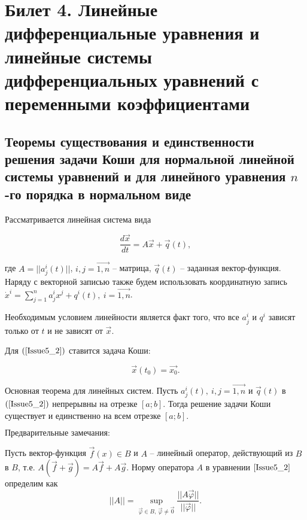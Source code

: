 \section{Билет 4. Линейные дифференциальные уравнения и линейные системы дифференциальных уравнений с переменными коэффициентами}

\subsection{Теоремы существования и единственности решения задачи Коши для нормальной линейной системы уравнений и
для линейного уравнения $n$-го порядка в нормальном виде}

Рассматривается линейная система вида

\begin{equation}
	\frac{d\overrightarrow{x}}{dt} = A\overrightarrow{x} + \overrightarrow{q}(t),
	\label{Issue5_2}
\end{equation}

где $A = ||a_j^i(t)||$, $i, j = \overrightarrow{1, n}$ -- матрица, $\overrightarrow{q}(t)$ -- заданная вектор-функция. Наряду с векторной записью также будем использовать координатную запись $\dot{x}^i = \sum\limits_{j = 1}^{n} a_j^i x^j + q^i(t),\ i = \overrightarrow{1, n}$.

$\textbf{Необходимым условием линейности}$ является факт того, что все $a_j^i$ и $q^i$ зависят только от $t$ и не зависят от $\overrightarrow{x}$.

Для $(\ref{Issue5_2})$ ставится задача Коши:

\[ \overrightarrow{x}(t_0) = \overrightarrow{x_0}.\]

\begin{theorem}

$\textbf{Основная теорема для линейных систем.}$ Пусть $a_j^i(t),\ i, j = \overrightarrow{1, n}$ и $\overrightarrow{q}(t)$ в $(\ref{Issue5_2})$ непрерывны на отрезке $[a;b]$. Тогда решение задачи Коши существует и единственно на всем отрезке $[a;b].$
\label{4_1_Cauchy}
\end{theorem}

$\textbf{Предварительные замечания:}$

Пусть вектор-функция $\overrightarrow{f}(x) \in B$ и $A$ -- линейный оператор, действующий из $B$ в $B$, т.е. $A(\overrightarrow{f} + \overrightarrow{g}) = A\overrightarrow{f} + A\overrightarrow{g}$.
Норму оператора $A$ в уравнении $\eqref{Issue5_2}$ определим как
\[ ||A|| =  \sup\limits_{\overrightarrow{\varphi} \in B,\ \overrightarrow{\varphi} \neq \overrightarrow{0}} \frac{||A\overrightarrow{\varphi}||}{||\overrightarrow{\varphi}||}. \]

